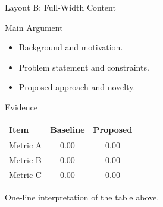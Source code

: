 \documentclass[aspectratio=169,9pt]{beamer}
\begin{document}
\begin{frame}{Layout B: Full-Width Content}

\begin{block}{Main Argument}
\begin{itemize}
    \item Background and motivation.
    \item Problem statement and constraints.
    \item Proposed approach and novelty.
\end{itemize}
\end{block}

\vspace{0.25em}
\begin{block}{Evidence}
\centering
\begin{tabular}{lcc}
\toprule
Item & Baseline & Proposed \\
\midrule
Metric A & 0.00 & 0.00 \\
Metric B & 0.00 & 0.00 \\
Metric C & 0.00 & 0.00 \\
\bottomrule
\end{tabular}

\vspace{0.3em}
{\scriptsize One-line interpretation of the table above.}
\end{block}

\end{frame}
\end{document}
